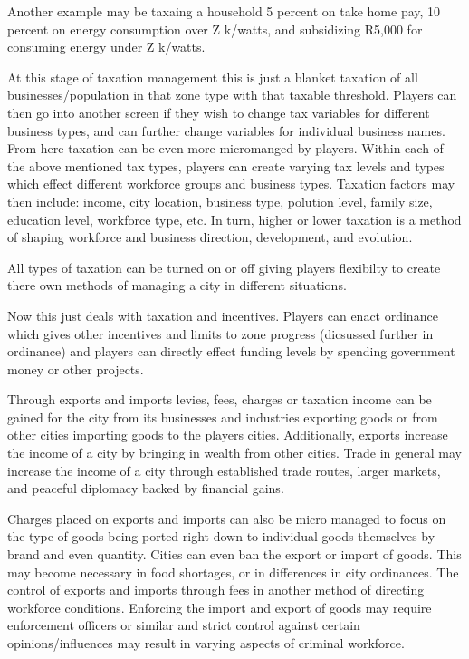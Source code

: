 Another example may be taxaing a household 5 percent on take home pay, 10 percent on energy consumption over Z k/watts, and subsidizing R5,000 for consuming energy under Z k/watts.


At this stage of taxation management this is just a blanket taxation of all businesses/population in that zone type with that taxable threshold. Players can then go into another screen if they wish to change tax variables for different business types, and can further change variables for individual business names. From here taxation can be even more micromanged by players. Within each of the above mentioned tax types, players can create varying tax levels and types which effect different workforce groups and business types. Taxation factors may then include: income, city location, business type, polution level, family size, education level, workforce type, etc. In turn, higher or lower taxation is a method of shaping workforce and business direction, development, and evolution. 

All types of taxation can be turned on or off giving players flexibilty to create there own methods of managing a city in different situations.

Now this just deals with taxation and incentives. Players can enact ordinance which gives other incentives and limits to zone progress (dicsussed further in ordinance) and players can directly effect funding levels by spending government money or other projects. 



Through exports and imports levies, fees, charges or taxation income can be gained for the city from its businesses and industries exporting goods or from other cities importing goods to the players cities. Additionally, exports increase the income of a city by bringing in wealth from other cities. Trade in general may increase the income of a city through established trade routes, larger markets, and peaceful diplomacy backed by financial gains. 

Charges placed on exports and imports can also be micro managed to focus on the type of goods being ported right down to individual goods themselves by brand and even quantity. Cities can even ban the export or import of goods. This may become necessary in food shortages, or in differences in city ordinances. The control of exports and imports through fees in another method of directing workforce conditions. Enforcing the import and export of goods may require enforcement officers or similar and strict control against certain opinions/influences may result in varying aspects of criminal workforce.


